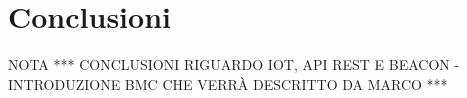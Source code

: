 \chapter{Conclusioni}
\label{chap:conc}

\begin{Huge}
NOTA *** CONCLUSIONI RIGUARDO IOT, API REST E BEACON - INTRODUZIONE BMC CHE VERRÀ DESCRITTO DA MARCO *** 
\end{Huge}
